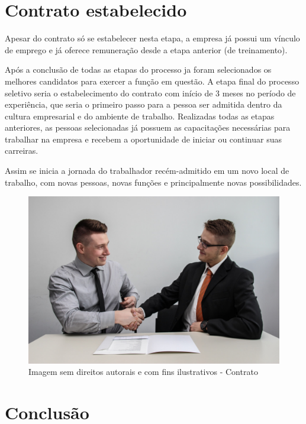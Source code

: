 \documentclass[12pt]{article}
\begin{document}
\section{Contrato estabelecido}

Apesar do contrato só se estabelecer nesta etapa, a empresa já possui um vínculo de emprego e já oferece remuneração desde a etapa anterior (de treinamento).

Após a conclusão de todas as etapas do processo ja foram selecionados os melhores candidatos para exercer a função em questão. A etapa final do processo seletivo seria o estabelecimento do contrato com início de 3 meses no período de experiência, que seria o primeiro passo para a pessoa ser admitida dentro da cultura empresarial e do ambiente de trabalho. Realizadas todas as etapas anteriores, as pessoas selecionadas já possuem as capacitações necessárias para trabalhar na empresa e recebem a oportunidade de iniciar ou continuar suas carreiras.

Assim se inicia a jornada do trabalhador recém-admitido em um novo local de trabalho, com novas pessoas, novas funções e principalmente novas possibilidades.

\begin{figure}[h]
	\centering
	\includegraphics[width=1.0\textwidth]{build/images/mao}
	\caption{Imagem sem direitos autorais e com fins ilustrativos - Contrato}
	\label{fig:mesh1}
\end{figure}

\newpage

\section{Conclusão}
\end{document}
